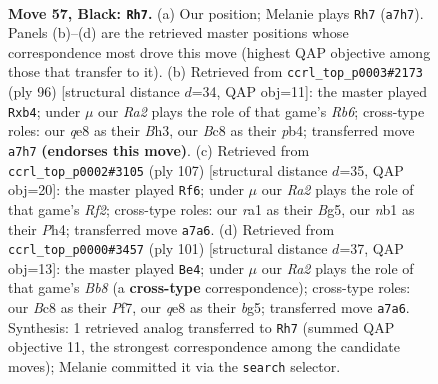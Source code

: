 \documentclass[11pt]{article}
\begin{document}
\begin{figure}[p]\centering
\begin{subfigure}{0.46\textwidth}\centering
\resizebox{\linewidth}{!}{%
\newchessgame
\chessboard[
  setfen={1Bb1Q3/r7/8/p1kp1p2/P6P/8/8/RN4K1 b - - 0 57},
  showmover=false,
  pgfstyle=straightmove, color=movearrow, markmove={a7-h7}
]}
\caption{}
\end{subfigure}\hfill
\begin{subfigure}{0.46\textwidth}\centering
\resizebox{\linewidth}{!}{%
\newchessgame
\chessboard[
  setfen={3b4/5k2/1R1P3p/3r3p/1p2p3/1P5B/5P2/6K1 w - - 0 49},
  showmover=false,
  pgfstyle=straightmove, color=movearrow, markmove={b6-b4}
]}
\caption{}
\end{subfigure}
\\[4pt]
\begin{subfigure}{0.46\textwidth}\centering
\resizebox{\linewidth}{!}{%
\newchessgame
\chessboard[
  setfen={6B1/5r2/3kp3/6b1/1P5p/R6P/6K1/8 b - - 15 54},
  showmover=false,
  pgfstyle=straightmove, color=movearrow, markmove={f7-f6}
]}
\caption{}
\end{subfigure}\hfill
\begin{subfigure}{0.46\textwidth}\centering
\resizebox{\linewidth}{!}{%
\newchessgame
\chessboard[
  setfen={8/5p1p/2k5/6B1/1p1r4/1P4KP/PR6/1b6 b - - 8 51},
  showmover=false,
  pgfstyle=straightmove, color=movearrow, markmove={b1-e4}
]}
\caption{}
\end{subfigure}
\caption{\textbf{Move 57, Black: \texttt{Rh7}.} (a) Our position; Melanie plays \texttt{Rh7} (\texttt{a7h7}). Panels (b)--(d) are the retrieved master positions whose correspondence most drove this move (highest QAP objective among those that transfer to it). (b) Retrieved from \texttt{ccrl\_top\_p0003\#2173} (ply 96) [structural distance $d$=34, QAP obj=11]: the master played \texttt{Rxb4}; under $\mu$ our \emph{Ra2} plays the role of that game's \emph{Rb6}; cross-type roles: our \emph{q}e8 as their \emph{B}h3, our \emph{B}c8 as their \emph{p}b4; transferred move \texttt{a7h7} \textbf{(endorses this move)}. (c) Retrieved from \texttt{ccrl\_top\_p0002\#3105} (ply 107) [structural distance $d$=35, QAP obj=20]: the master played \texttt{Rf6}; under $\mu$ our \emph{Ra2} plays the role of that game's \emph{Rf2}; cross-type roles: our \emph{r}a1 as their \emph{B}g5, our \emph{n}b1 as their \emph{P}h4; transferred move \texttt{a7a6}. (d) Retrieved from \texttt{ccrl\_top\_p0000\#3457} (ply 101) [structural distance $d$=37, QAP obj=13]: the master played \texttt{Be4}; under $\mu$ our \emph{Ra2} plays the role of that game's \emph{Bb8} (a \textbf{cross-type} correspondence); cross-type roles: our \emph{B}c8 as their \emph{P}f7, our \emph{q}e8 as their \emph{b}g5; transferred move \texttt{a7a6}. Synthesis: 1 retrieved analog transferred to \texttt{Rh7} (summed QAP objective 11, the strongest correspondence among the candidate moves); Melanie committed it via the \texttt{search} selector.}
\label{fig:thought-m113}
\end{figure}
\end{document}
